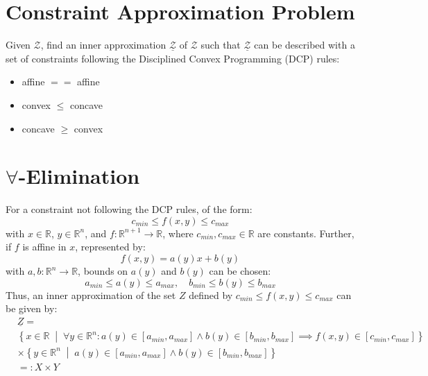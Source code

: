 \section{Constraint Approximation Problem}

Given $\mathcal{Z}$, find an inner approximation $\underline{\mathcal{Z}}$ of $\mathcal{Z}$ such that $\underline{\mathcal{Z}}$ can be described with a set of constraints following the Disciplined Convex Programming (DCP) rules:
\begin{itemize}
	\item affine $==$ affine
	\item convex $\leq$ concave
	\item concave $\geq$ convex
\end{itemize}

\section{\texorpdfstring{$\forall$}{For all}-Elimination}

For a constraint not following the DCP rules, of the form:
\begin{equation}
	c_{min} \leq f(x, y) \leq c_{max}
\end{equation}
with $x \in \mathbb{R}$, $y \in \mathbb{R}^n$, and $f: \mathbb{R}^{n+1} \to \mathbb{R}$, where $c_{min}, c_{max} \in \mathbb{R}$ are constants. Further, if $f$ is affine in $x$, represented by:
\begin{equation}
	f(x, y) = a(y) x + b(y)
\end{equation}
with $a, b : \mathbb{R}^n \to \mathbb{R}$, bounds on $a(y)$ and $b(y)$ can be chosen:
\[
	a_{min} \leq a(y) \leq a_{max}, \quad b_{min} \leq b(y) \leq b_{max}
\]
Thus, an inner approximation of the set $Z$ defined by $c_{min} \leq f(x, y) \leq c_{max}$ can be given by:
\begin{equation}
	\begin{aligned}
		 & \underline{Z} =                                                                                                                                                                    \\
		 & \left\{ x \in \mathbb{R} \;\middle|\; \forall y \in \mathbb{R}^n : a(y) \in [a_{min}, a_{max}] \land b(y) \in [b_{min}, b_{max}] \implies f(x, y) \in  [c_{min}, c_{max}] \right\} \\
		 & \times \left\{ y \in \mathbb{R}^n \;\middle|\; a(y) \in [a_{min}, a_{max}] \land b(y) \in [b_{min}, b_{max}] \right\}                                                              \\
		 & =: X \times Y
	\end{aligned}
\end{equation}
